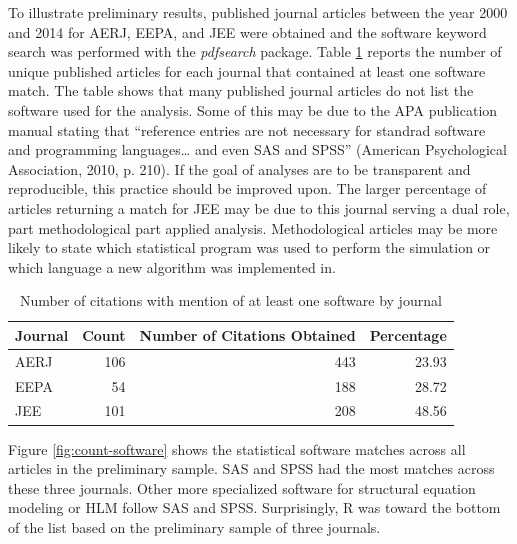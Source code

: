 \documentclass[english,man]{apa6}
\theoremstyle{definition}
\theoremstyle{definition}
\theoremstyle{remark}
\begin{document}
To illustrate preliminary results, published journal articles between
the year 2000 and 2014 for AERJ, EEPA, and JEE were obtained and the
software keyword search was performed with the \emph{pdfsearch} package.
Table \ref{tab:setup} reports the number of unique published articles
for each journal that contained at least one software match. The table
shows that many published journal articles do not list the software used
for the analysis. Some of this may be due to the APA publication manual
stating that \enquote{reference entries are not necessary for standrad
software and programming languages\ldots{} and even SAS and SPSS}
(American Psychological Association, 2010, p. 210). If the goal of
analyses are to be transparent and reproducible, this practice should be
improved upon. The larger percentage of articles returning a match for
JEE may be due to this journal serving a dual role, part methodological
part applied analysis. Methodological articles may be more likely to
state which statistical program was used to perform the simulation or
which language a new algorithm was implemented in.

\begin{table}

\caption{\label{tab:setup}Number of citations with mention of at least one software by journal}
\centering
\begin{tabular}[t]{lrrr}
\toprule
Journal & Count & Number of Citations Obtained & Percentage\\
\midrule
AERJ & 106 & 443 & 23.93\\
EEPA & 54 & 188 & 28.72\\
JEE & 101 & 208 & 48.56\\
\bottomrule
\end{tabular}
\end{table}

Figure \ref{fig:count-software} shows the statistical software matches
across all articles in the preliminary sample. SAS and SPSS had the most
matches across these three journals. Other more specialized software for
structural equation modeling or HLM follow SAS and SPSS. Surprisingly, R
was toward the bottom of the list based on the preliminary sample of
three journals.
\end{document}
